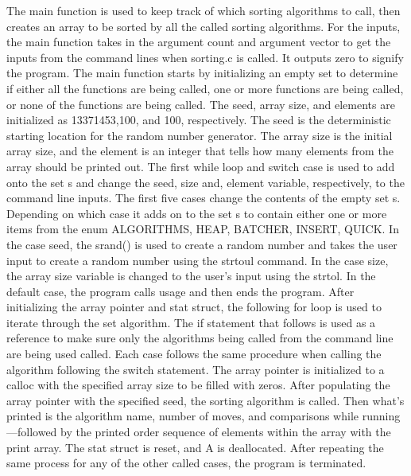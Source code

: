 \documentclass[11pt]{article} %
\begin{document}
\begin{flushleft}
The main function is used to keep track of which sorting algorithms to call, then creates an array to be sorted by all the called sorting algorithms. For the inputs, the main function takes in the argument count and argument vector to get the inputs from the command lines when sorting.c is called. It outputs zero to signify the program. The main function starts by initializing an empty set to determine if either all the functions are being called, one or more functions are being called, or none of the functions are being called. The seed, array size, and elements are initialized as 13371453,100, and 100, respectively. The seed is the deterministic starting location for the random number generator. The array size is the initial array size, and the element is an integer that tells how many elements from the array should be printed out. The first while loop and switch case is used to add onto the set s and change the seed, size and, element variable, respectively, to the command line inputs. The first five cases change the contents of the empty set s. Depending on which case it adds on to the set s to contain either one or more items from the enum ALGORITHMS, {HEAP, BATCHER, INSERT, QUICK}. In the case seed, the srand() is used to create a random number and takes the user input to create a random number using the strtoul command. In the case size, the array size variable is changed to the user's input using the strtol. In the default case, the program calls usage and then ends the program. After initializing the array pointer and stat struct, the following for loop is used to iterate through the set algorithm. The if statement that follows is used as a reference to make sure only the algorithms being called from the command line are being used called. Each case follows the same procedure when calling the algorithm following the switch statement. The array pointer is initialized to a calloc with the specified array size to be filled with zeros. After populating the array pointer with the specified seed, the sorting algorithm is called. Then what's printed is the algorithm name, number of moves, and comparisons while running—followed by the printed order sequence of elements within the array with the print array. The stat struct is reset, and A is deallocated. After repeating the same process for any of the other called cases, the program is terminated.

\end{flushleft}
\end{document}
